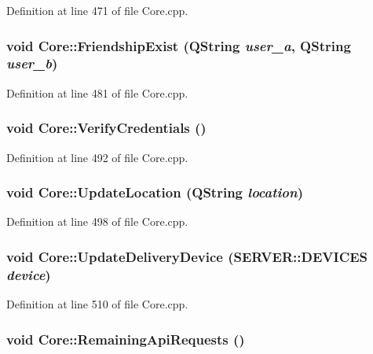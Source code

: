 Definition at line 471 of file Core.cpp.\hypertarget{classCore_0430da6765198a4f763ea7528f8e1e86}{
\subsubsection{\setlength{\rightskip}{0pt plus 5cm}void Core::FriendshipExist (QString {\em user\_\-a}, \/  QString {\em user\_\-b})}}
\label{classCore_0430da6765198a4f763ea7528f8e1e86}




Definition at line 481 of file Core.cpp.\hypertarget{classCore_e7b7355b923afe51411e3c949679904d}{
\subsubsection{\setlength{\rightskip}{0pt plus 5cm}void Core::VerifyCredentials ()}}
\label{classCore_e7b7355b923afe51411e3c949679904d}




Definition at line 492 of file Core.cpp.\hypertarget{classCore_62635d6cffb1fbef9f5c650518f83c67}{
\subsubsection{\setlength{\rightskip}{0pt plus 5cm}void Core::UpdateLocation (QString {\em location})}}
\label{classCore_62635d6cffb1fbef9f5c650518f83c67}




Definition at line 498 of file Core.cpp.\hypertarget{classCore_291a15a3ec5ebadc314c991f74cde776}{
\subsubsection{\setlength{\rightskip}{0pt plus 5cm}void Core::UpdateDeliveryDevice ({\bf SERVER::DEVICES} {\em device})}}
\label{classCore_291a15a3ec5ebadc314c991f74cde776}




Definition at line 510 of file Core.cpp.\hypertarget{classCore_0cf4c10e33b1158e651977210312ea13}{
\subsubsection{\setlength{\rightskip}{0pt plus 5cm}void Core::RemainingApiRequests ()}}
\label{classCore_0cf4c10e33b1158e651977210312ea13}




